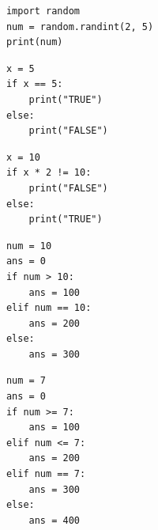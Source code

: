 \documentclass[dvipsnames, svgnames, x11names, handout]{beamer}
\begin{document}
\begin{frame}[fragile]{}
    \begin{center}
        \begin{verbatim}
            import random
            num = random.randint(2, 5)
            print(num)
        \end{verbatim}
    \end{center}
\end{frame}

\begin{frame}[fragile]{}
    \begin{center}
        \begin{verbatim}
            x = 5
            if x == 5:
                print("TRUE")
            else:
                print("FALSE")
        \end{verbatim}
    \end{center}
\end{frame}

\begin{frame}[fragile]{}
    \begin{center}
        \begin{verbatim}
            x = 10
            if x * 2 != 10:
                print("FALSE")
            else:
                print("TRUE")
        \end{verbatim}
    \end{center}
\end{frame}

\begin{frame}[fragile]{}
    \begin{center}
        \begin{verbatim}
            num = 10
            ans = 0
            if num > 10:
                ans = 100
            elif num == 10:
                ans = 200
            else:
                ans = 300
        \end{verbatim}
    \end{center}
\end{frame}

\begin{frame}[fragile]{}
    \begin{center}
        \begin{verbatim}
            num = 7
            ans = 0
            if num >= 7:
                ans = 100
            elif num <= 7:
                ans = 200
            elif num == 7:
                ans = 300
            else:
                ans = 400
        \end{verbatim}
    \end{center}
\end{frame}
\end{document}
